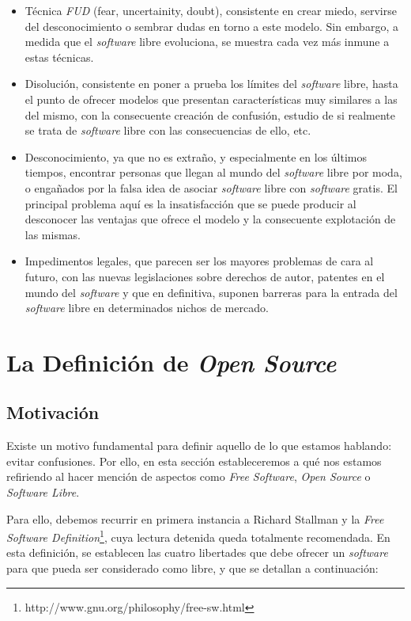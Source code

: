 \begin{itemize}
  \item Técnica \textit{FUD} (fear, uncertainity, doubt), consistente en crear
miedo, servirse del desconocimiento o sembrar dudas en torno a este modelo. Sin
embargo, a medida que el \textit{software} libre evoluciona, se muestra cada vez
más inmune a estas técnicas.
  \item Disolución, consistente en poner a prueba los límites del
\textit{software} libre, hasta el punto de ofrecer modelos que presentan
características muy similares a las del mismo, con la consecuente creación de
confusión, estudio de si realmente se trata de \textit{software} libre con las
consecuencias de ello, etc.
  \item Desconocimiento, ya que no es extraño, y especialmente en los últimos
tiempos, encontrar personas que llegan al mundo del \textit{software} libre por
moda, o engañados por la falsa idea de asociar \textit{software} libre con
\textit{software} gratis. El principal problema aquí es la insatisfacción que se
puede producir al desconocer las ventajas que ofrece el modelo y la consecuente
explotación de las mismas.
  \item Impedimentos legales, que parecen ser los mayores problemas de cara al
futuro, con las nuevas legislaciones sobre derechos de autor, patentes en el
mundo del \textit{software} y que en definitiva, suponen barreras para la
entrada del \textit{software} libre en determinados nichos de mercado.
\end{itemize}

\section{La Definición de \textit{Open Source}}

\subsection{Motivación}
\label{SUBSEC:DefinicionMotivacion}

Existe un motivo fundamental para definir aquello de lo que estamos hablando:
evitar confusiones. Por ello, en esta sección estableceremos a qué nos estamos
refiriendo al hacer mención de aspectos como \textit{Free Software},
\textit{Open Source} o \textit{Software Libre}.

Para ello, debemos recurrir en primera instancia a Richard Stallman y la
\textit{Free Software Definition}\footnote{
http://www.gnu.org/philosophy/free-sw.html }, cuya lectura detenida queda
totalmente recomendada. En esta definición, se establecen las cuatro libertades
que debe ofrecer un \textit{software} para que pueda ser considerado como libre,
y que se detallan a continuación:

